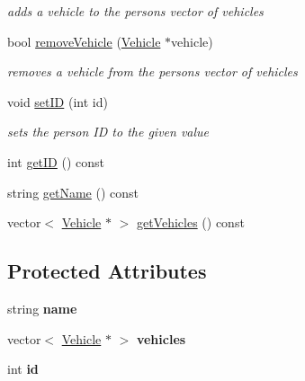 \begin{DoxyCompactItemize}
\begin{DoxyCompactList}\small\item\em adds a vehicle to the person\textquotesingle{}s vector of vehicles \end{DoxyCompactList}\item 
\hypertarget{class_person_ae804590441c0a4057c3e4a9912393f12}{}bool \hyperlink{class_person_ae804590441c0a4057c3e4a9912393f12}{remove\+Vehicle} (\hyperlink{class_vehicle}{Vehicle} $\ast$vehicle)\label{class_person_ae804590441c0a4057c3e4a9912393f12}

\begin{DoxyCompactList}\small\item\em removes a vehicle from the person\textquotesingle{}s vector of vehicles \end{DoxyCompactList}\item 
\hypertarget{class_person_aef412cfd816a9ffc60f6c99a9dc58dc1}{}void \hyperlink{class_person_aef412cfd816a9ffc60f6c99a9dc58dc1}{set\+I\+D} (int id)\label{class_person_aef412cfd816a9ffc60f6c99a9dc58dc1}

\begin{DoxyCompactList}\small\item\em sets the person I\+D to the given value \end{DoxyCompactList}\item 
int \hyperlink{class_person_a7ed80c648874ad61eb3f482ea50b1f26}{get\+I\+D} () const 
\item 
string \hyperlink{class_person_a5c06a41731a2656caec65e3bc39f5ebe}{get\+Name} () const 
\item 
vector$<$ \hyperlink{class_vehicle}{Vehicle} $\ast$ $>$ \hyperlink{class_person_abbf0a20a74ada90543dff88e9b0d6064}{get\+Vehicles} () const 
\end{DoxyCompactItemize}
\subsection*{Protected Attributes}
\begin{DoxyCompactItemize}
\item 
\hypertarget{class_person_a669b64897b4d823a27bb5866368d4dfa}{}string {\bfseries name}\label{class_person_a669b64897b4d823a27bb5866368d4dfa}

\item 
\hypertarget{class_person_a79076878abcbbdf33ff49e2dcb55b043}{}vector$<$ \hyperlink{class_vehicle}{Vehicle} $\ast$ $>$ {\bfseries vehicles}\label{class_person_a79076878abcbbdf33ff49e2dcb55b043}

\item 
\hypertarget{class_person_aec48a92f614a854ff380a15eb8e2f479}{}int {\bfseries id}\label{class_person_aec48a92f614a854ff380a15eb8e2f479}

\end{DoxyCompactItemize}


